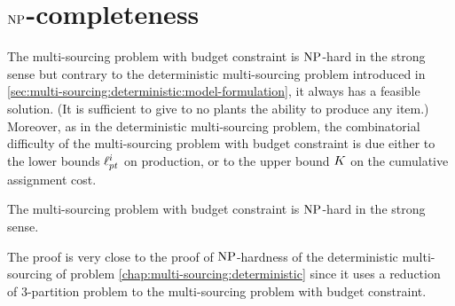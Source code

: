 \section{$\operatorname{NP}$-completeness}
\label{sec:multi-sourcing-limited-capital:NP-completeness}


The multi-sourcing problem with budget constraint is $\operatorname{NP}$-hard in the strong sense but contrary to the deterministic multi-sourcing problem introduced in \cref{sec:multi-sourcing:deterministic:model-formulation}, it always has a feasible solution.
(It is sufficient to give to no plants the ability to produce any item.)
Moreover, as in the deterministic multi-sourcing problem, the combinatorial difficulty of the multi-sourcing problem with budget constraint is due either to the lower bounds $\ell_{pt}^i$ on production, or to the upper bound $K$ on the cumulative assignment cost.


\begin{thm}\label{thm:det-multi-sourcing:limited-capital:strong-NP-hard}
  The multi-sourcing problem with budget constraint is $\operatorname{NP}$-hard in the strong sense.
\end{thm}


The proof is very close to the proof of $\operatorname{NP}$-hardness of the deterministic multi-sourcing of problem \cref{chap:multi-sourcing:deterministic} since it uses a reduction of 3-partition problem to the multi-sourcing problem with budget constraint.


